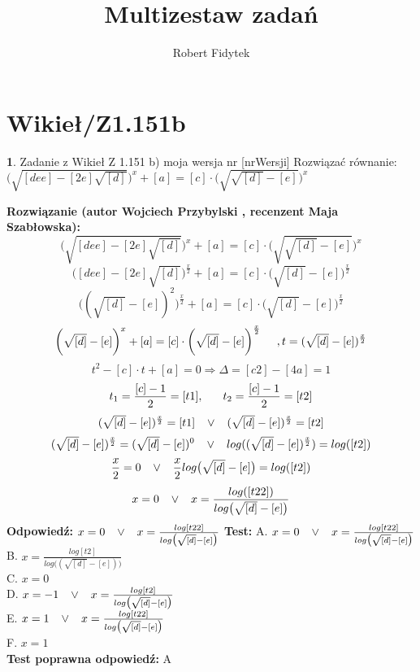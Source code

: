 \documentclass[12pt, a4paper]{article}
\title{Multizestaw zadań}
\author{Robert Fidytek}
\date{}
\theoremstyle{definition} %
\newtheorem{zad}{}
\newcommand{\kategoria}[1]{\section{#1}} %
\newcommand{\zadStart}[1]{\begin{zad}#1\newline} %
\newcommand{\zadStop}{\end{zad}}   %
\newcommand{\rozwStart}[2]{\noindent \textbf{Rozwiązanie (autor #1 , recenzent #2): }\newline} %
\newcommand{\rozwStop}{\newline}                                            %
\newcommand{\odpStart}{\noindent \textbf{Odpowiedź:}\newline}    %
\newcommand{\odpStop}{\newline}                                             %
\newcommand{\testStart}{\noindent \textbf{Test:}\newline} %
\newcommand{\testStop}{\newline} %
\newcommand{\kluczStart}{\noindent \textbf{Test poprawna odpowiedź:}\newline} %
\newcommand{\kluczStop}{\newline} %
\begin{document}
\maketitle


\kategoria{Wikieł/Z1.151b}
\zadStart{Zadanie z Wikieł Z 1.151 b) moja wersja nr [nrWersji]}
Rozwiązać równanie: $\bigg(\sqrt{[dee]-[2e]\sqrt{[d]}}\bigg)^{x}+[a]=[c]\cdot\bigg(\sqrt{\sqrt{[d]}-[e]}\bigg)^{x}$
\zadStop
\rozwStart{Wojciech Przybylski}{Maja Szabłowska}
$$\bigg(\sqrt{[dee]-[2e]\sqrt{[d]}}\bigg)^{x}+[a]=[c]\cdot\bigg(\sqrt{\sqrt{[d]}-[e]}\bigg)^{x}$$
$$\bigg([dee]-[2e]\sqrt{[d]}\bigg)^{\frac{x}{2}}+[a]=[c]\cdot\bigg(\sqrt{[d]}-[e]\bigg)^{\frac{x}{2}}$$
$$\bigg((\sqrt{[d]}-[e])^{2}\bigg)^{\frac{x}{2}}+[a]=[c]\cdot\bigg(\sqrt{[d]}-[e]\bigg)^{\frac{x}{2}}$$
$$\bigg(\sqrt{[d]}-[e]\bigg)^{x}+[a]=[c]\cdot\bigg(\sqrt{[d]}-[e]\bigg)^{\frac{x}{2}}\hspace{5mm}, t=(\sqrt{[d]}-[e])^{\frac{x}{2}}$$
$$t^{2}-[c]\cdot t+[a]=0 \Rightarrow \Delta=[c2]-[4a]=1$$
$$t_{1}=\frac{[c]-1}{2}=[t1], \hspace{6mm} t_{2}=\frac{[c]-1}{2}=[t2]$$
$$(\sqrt{[d]}-[e])^{\frac{x}{2}}=[t1]  \hspace{3mm} \vee  \hspace{3mm}(\sqrt{[d]}-[e])^{\frac{x}{2}}=[t2]$$
$$(\sqrt{[d]}-[e])^{\frac{x}{2}}=(\sqrt{[d]}-[e])^{0}  \hspace{3mm} \vee  \hspace{3mm} log((\sqrt{[d]}-[e])^{\frac{x}{2}})=log([t2])$$
$$\frac{x}{2}=0  \hspace{3mm} \vee  \hspace{3mm} \frac{x}{2}log\big(\sqrt{[d]}-[e]\big)=log([t2])$$
$$x=0  \hspace{3mm} \vee  \hspace{3mm} x=\frac{log([t22])}{log\big(\sqrt{[d]}-[e]\big)}$$
\rozwStop
\odpStart
$x=0  \hspace{3mm} \vee  \hspace{3mm} x=\frac{log[t22]}{log\big(\sqrt{[d]}-[e]\big)}$
\odpStop
\testStart
A. $x=0  \hspace{3mm} \vee  \hspace{3mm} x=\frac{log[t22]}{log\big(\sqrt{[d]}-[e]\big)}$\\
B. $x=\frac{log[t2]}{log\big((\sqrt{[d]}-[e])\big)}$\\
C. $x=0$\\
D. $x=-1  \hspace{3mm} \vee  \hspace{3mm} x=\frac{log[t2]}{log\big(\sqrt{[d]}-[e]\big)}$\\
E. $x=1  \hspace{3mm} \vee  \hspace{3mm} x=\frac{log[t22]}{log\big(\sqrt{[d]}-[e]\big)}$\\
F. $x=1$\\
\testStop
\kluczStart
A
\kluczStop
\end{document}
